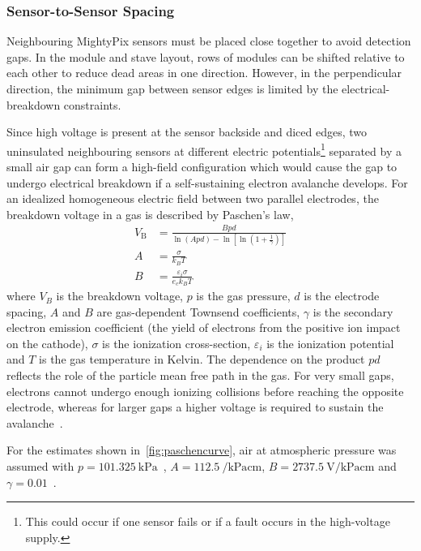 \subsubsection{Sensor-to-Sensor Spacing}
Neighbouring MightyPix sensors must be placed close together to avoid detection gaps. In the module and stave layout, rows of modules can be shifted relative to each other to reduce dead areas in one direction. However, in the perpendicular direction, the minimum gap between sensor edges is limited by the electrical-breakdown constraints.\par
\newpage
Since high voltage is present at the sensor backside and diced edges, two uninsulated neighbouring sensors at different electric potentials\footnote{This could occur if one sensor fails or if a fault occurs in the high-voltage supply.} separated by a small air gap can form a high-field configuration which would cause the gap to undergo electrical breakdown if a self-sustaining electron avalanche develops. For an idealized homogeneous electric field between two parallel electrodes, the breakdown voltage in a gas is described by Paschen's law,
\begin{align}
    V_{\mathrm{B}} &= \frac{Bpd}{\ln{(Apd)}-\ln{\left[ \ln\left(1+\frac{1}{\gamma}\right) \right]}}\label{equ:paschen}\\
    A &= \frac{\sigma}{k_B T}\\
    B &= \frac{\varepsilon_i\sigma}{e_c k_B T} 
\end{align}
where $V_B$ is the breakdown voltage, $p$ is the gas pressure, $d$ is the electrode spacing, $A$ and $B$ are gas-dependent Townsend coefficients, $\gamma$ is the secondary electron emission coefficient (the yield of electrons from the positive ion impact on the cathode), $\sigma$ is the ionization cross-section, $\varepsilon_i$ is the ionization potential and $T$ is the gas temperature in Kelvin. The dependence on the product $pd$ reflects the role of the particle mean free path in the gas. For very small gaps, electrons cannot undergo enough ionizing collisions before reaching the opposite electrode, whereas for larger gaps a higher voltage is required to sustain the avalanche~\cite{Galli_Paschen_law}.\par
For the estimates shown in~\cref{fig:paschencurve}, air at atmospheric pressure was assumed with $p = \SI{101.325}{\kilo\pascal}$~\cite{NIST_atm}, $A = \SI{112.5}{\per\kilo\pascal\centi\meter}$, $B = \SI{2737.5}{\volt\per\kilo\pascal\centi\meter}$ and $\gamma = 0.01$~\cite{IEEE_Trans_electr_ins}.\par
